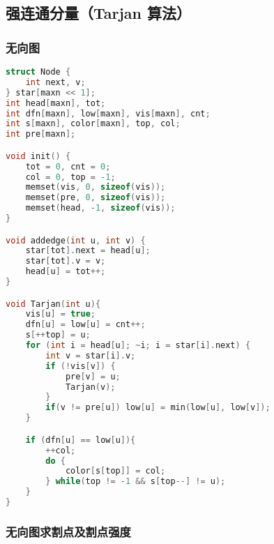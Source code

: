 \subsection{强连通分量（Tarjan 算法）}

\subsubsection{无向图}

\begin{lstlisting}[language=C++]
struct Node {
    int next, v;
} star[maxn << 1];
int head[maxn], tot;
int dfn[maxn], low[maxn], vis[maxn], cnt;
int s[maxn], color[maxn], top, col;
int pre[maxn];

void init() {
    tot = 0, cnt = 0;
    col = 0, top = -1;
    memset(vis, 0, sizeof(vis));
    memset(pre, 0, sizeof(vis));
    memset(head, -1, sizeof(vis));
}

void addedge(int u, int v) {
    star[tot].next = head[u];
    star[tot].v = v;
    head[u] = tot++;
}

void Tarjan(int u){
    vis[u] = true;
    dfn[u] = low[u] = cnt++;
    s[++top] = u;
    for (int i = head[u]; ~i; i = star[i].next) {
        int v = star[i].v;
        if (!vis[v]) {
            pre[v] = u;
            Tarjan(v);
        }
        if(v != pre[u]) low[u] = min(low[u], low[v]);
    }

    if (dfn[u] == low[u]){
        ++col;
        do {
            color[s[top]] = col;
        } while(top != -1 && s[top--] != u);
    }
}
\end{lstlisting}

\subsubsection{无向图求割点及割点强度}

